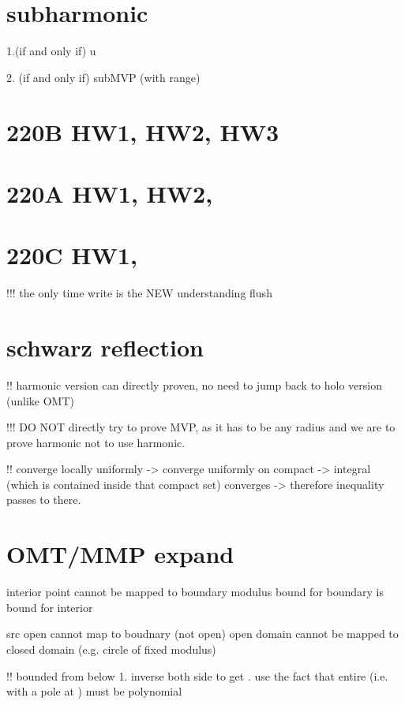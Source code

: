 \section*{subharmonic}
1.(if and only if) \Delta u 
	
2. (if and only if) subMVP (with range)






\section*{220B HW1, HW2, HW3}
\section*{220A HW1, HW2, }
\section*{220C HW1, }


!!! the only time write is the NEW understanding flush

\section*{schwarz reflection}
!! harmonic version can directly proven, no need to jump back to holo version (unlike OMT)

!!! DO NOT directly try to prove MVP, as it has to be any radius and we are to prove harmonic not to use harmonic.


!! converge locally uniformly -> converge uniformly on compact -> integral (which is contained inside that compact set) converges -> therefore inequality passes to there.


\section*{OMT/MMP expand}
interior point cannot be mapped to boundary
modulus bound for boundary is bound for interior

src open cannot map to boudnary (not open)
open domain cannot be mapped to closed domain (e.g. circle of fixed modulus)


!! bounded from below
	1. inverse both side to get . use the fact that entire \to \infty (i.e. with a pole at \infty) must be polynomial

